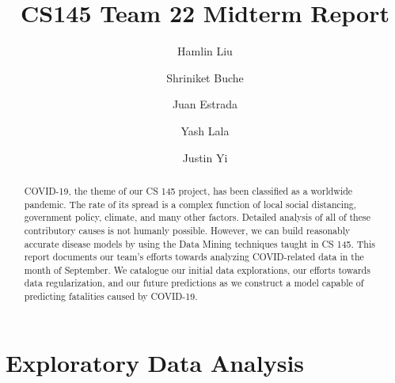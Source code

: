 \documentclass[sigconf]{acmart}
\begin{document}
\title{CS145 Team 22 Midterm Report}

\author{Hamlin Liu}

\author{Shriniket Buche}

\author{Juan Estrada}

\author{Yash Lala}

\author{Justin Yi}


\renewcommand{\shortauthors}{Hamlin Liu, et al.}

\begin{abstract}
COVID-19, the theme of our CS 145 project, has been classified as a worldwide pandemic. The rate of its spread is a complex function of local social distancing, government policy, climate, and many other factors. Detailed analysis of all of these contributory causes is not humanly possible. However, we can build reasonably accurate disease models by using the Data Mining techniques taught in CS 145. This report documents our team’s efforts towards analyzing COVID-related data in the month of September. We catalogue our initial data explorations, our efforts towards data regularization, and our future predictions as we construct a model capable of predicting fatalities caused by COVID-19. 
\end{abstract}

\maketitle

\section{Exploratory Data Analysis}
\end{document}
